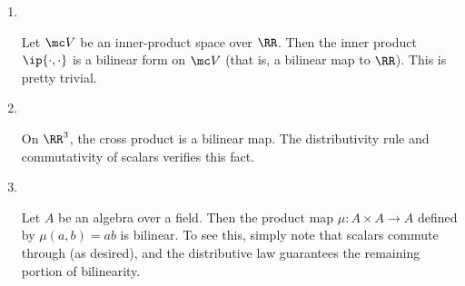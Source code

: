 \documentclass{fkbook}
\theoremstyle{snazzydefinition}
\newenvironment{example}
  {\pushQED{\oldqed}\renewcommand{\qedsymbol}{$\triangle$}\examplex}
  {\popQED\endexamplex}
\begin{document}
  \begin{enumerate}[label=\arabic*.]
    \item ~\vspace{-1.25em}
      \begin{leftbar}\vspace{-1em}
        \begin{example}
          Let $\mc V$ be an inner-product space over $\RR$. Then the
          inner product $\ip{\cdot, \cdot}$ is a bilinear form on $\mc
          V$ (that is, a bilinear map to $\RR$). This is pretty
          trivial.
        \end{example}
      \end{leftbar}
    \item ~\vspace{-1.25em}
      \begin{leftbar}\vspace{-1em}
        \begin{example}
          On $\RR^3$, the cross product is a bilinear map. The
          distributivity rule and commutativity of scalars verifies
          this fact.
        \end{example}
      \end{leftbar}
    \item~\vspace{-1.25em}
      \begin{leftbar}\vspace{-1em}
        \begin{example}
          Let $A$ be an algebra over a field. Then the product map $\mu :
          A \times A \to A$ defined by $\mu(a,b) = ab$ is bilinear. To see
          this, simply note that scalars commute through (as desired), and
          the distributive law guarantees the remaining portion of
          bilinearity.


\end{example}
\end{leftbar}
\end{enumerate}
\end{document}
